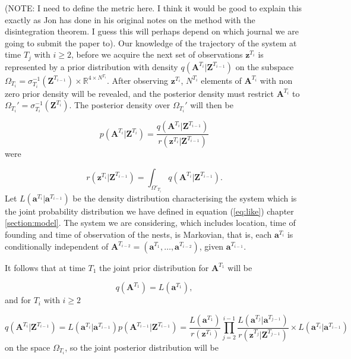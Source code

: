 \documentclass{article}
\renewcommand{\vec}[1]{\mathbf{#1}}
\begin{document}
(NOTE: I need to define the metric here. I think it would be good to explain this exactly as Jon has done in his original notes on the method with the disintegration theorem. I guess this will perhaps depend on which journal we are going to submit the paper to).
Our knowledge of the trajectory of the system at time $T_j$ with $i \geq 2$, before we acquire the next set of observations $\vec{z}^{T_i}$ is represented by a prior distribution with density $q(\vec{A}^{T_i} | \vec{Z}^{T_{i-1}})$ on the subspace $\Omega_{T_i} = \sigma_{T_i}^{-1} (\vec{Z}^{T_{i-1}}) \times \mathbb{R}^{4 \times N^{T_i}}$. After observing $\vec{z}^{T_i}$, $N^{T_i}$ elements of $\vec{A}^{T_i}$ with non zero prior density will be revealed, and the posterior density must restrict $\vec{A}^{T_i}$ to $\Omega_{T_i}' = \sigma_{T_i}^{-1}(\vec{Z}^{T_i})$. The posterior density over $\Omega_{T_i}'$ will then be

\begin{equation*}
    p(\vec{A}^{T_i} | \vec{Z}^{T_i}) = \frac{q(\vec{A}^{T_i} | \vec{Z}^{T_{i-1}})}{r(\vec{z}^{T_i} | \vec{Z}^{T_{i-1}})}
\end{equation*}
were

\begin{equation*}
    r(\vec{z}^{T_i} | \vec{Z}^{T_{i-1}}) = \int_{\Omega'_{T_i}} q(\vec{A}^{T_i} | \vec{Z}^{T_{i-1}}).
\end{equation*}
Let $L(\vec{a}^{T_i} | \vec{a}^{T_{i-1}})$ be the density distribution characterising the system which is the joint probability distribution we have defined in equation (\ref{eq:like}) chapter  \ref{section:model}. The system we are considering, which includes location, time of founding and time of observation of the nests, is Markovian, that is, each $\vec{a}^{T_i}$ is conditionally independent of $\vec{A}^{T_{i-2}} = (\vec{a}^{T_1}, \ldots,\vec{a}^{T_{i-2}})$, given $\vec{a}^{T_{i-1}}$.

It follows that at time $T_1$ the joint prior distribution for $\vec{A}^{T_1}$ will be

\begin{equation*}
    q(\vec{A}^{T_1}) = L(\vec{a}^{T_1}),
\end{equation*}
and for $T_i$ with $i \geq 2$

\begin{equation*}
    q(\vec{A}^{T_i} | \vec{Z}^{T_{i-1}}) = L(\vec{a}^{T_i} | \vec{a}^{T_{i-1}}) p(\vec{A}^{T_{i-1}} | \vec{Z}^{T_{i-1}}) = \frac{L(\vec{a}^{T_1})}{r(\vec{z}^{T_1})} \prod_{j=2}^{i-1} \frac{L(\vec{a}^{T_j} | \vec{a}^{T_{j-1}})}{r(\vec{z}^{T_j} | \vec{Z}^{T_{j-1}})} \times L(\vec{a}^{T_i} | \vec{a}^{T_{i-1}})
\end{equation*}
on the space $\Omega_{T_i}$, so the joint posterior distribution will be
\end{document}

